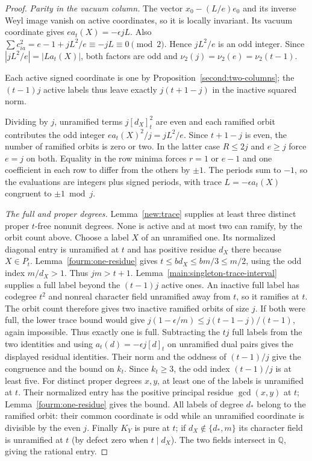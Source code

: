 \documentclass[11pt,a4paper]{article}
\numberwithin{equation}{section}
\theoremstyle{remark}
\begin{document}
\begin{proof}
\emph{Parity in the vacuum column.} The vector $x_0-(L/e)e_0$ and its inverse Weyl image vanish on active
coordinates, so it is locally invariant. Its vacuum coordinate gives
$ea_t(X)=-\epsilon jL$. Also
$\sum c_{ia}^2=e-1+jL^2/e\equiv -jL\equiv0\pmod2$.
Hence $jL^2/e$ is an odd integer. Since
$|jL^2/e|=|L a_t(X)|$, both factors are odd and
$\nu_2(j)=\nu_2(e)=\nu_2(t-1)$. 

Each active signed coordinate is one by Proposition~\ref{second:two-columns};
the $(t-1)j$ active labels thus leave exactly $j(t+1-j)$ in the
inactive squared norm.

Dividing by $j$, unramified
terms $j[d_X]_t^2$ are even and each ramified orbit contributes the
odd integer $ea_t(X)^2/j=jL^2/e$. Since $t+1-j$ is even, the number
of ramified orbits is zero or two. In the latter case $R\le2j$ and
$e\ge j$ force $e=j$ on both. Equality in the row minima forces
$r=1$ or $e-1$ and one coefficient in each row to differ from the
others by $\pm1$. The periods sum to $-1$, so the evaluations are
integers plus signed periods, with trace $L=-\epsilon a_t(X)$
congruent to $\pm1\bmod j$.

\emph{The full and proper degrees.} Lemma~\ref{new:trace} supplies at least three distinct
proper $t$-free nonunit degrees. None is active and at most two
can ramify, by the orbit count above. Choose a label $X$
of an unramified one. Its normalized diagonal entry is unramified
at $t$ and has positive residue $d_X$ there because $X\in P_t$.
Lemma~\ref{fourm:one-residue} gives
$t\le b d_X\le bm/3\le m/2$, using the odd index $m/d_X>1$.
Thus $jm>t+1$. Lemma~\ref{main:singleton-trace-interval} supplies a
full label beyond the $(t-1)j$ active ones.
An inactive full label has codegree $t^2$ and nonreal character field
unramified away from $t$, so it ramifies at $t$.
The orbit count therefore gives two inactive ramified orbits
of size $j$. If both were full, the lower trace bound would give
$j(1-\epsilon/m)\le j(t-1-j)/(t-1)$, again impossible.
Thus exactly one is full. Subtracting the $tj$ full labels from the two
identities and using $a_t(d)=-\epsilon j[d]_t$ on unramified dual
pairs gives the displayed residual identities. Their norm and the
oddness of $(t-1)/j$ give the congruence and the bound on $k_t$.
Since $k_t\ge3$, the odd index $(t-1)/j$ is at least five.
For distinct proper degrees $x,y$, at least one of the labels is
unramified at $t$. Their normalized entry has the positive principal
residue $\gcd(x,y)$ at $t$; Lemma~\ref{fourm:one-residue} gives the bound.
All labels of degree $d_*$ belong to the ramified orbit: their common
coordinate is odd while an unramified coordinate is divisible by the
even $j$. Finally $K_Y$ is pure at $t$; if $d_X\notin\{d_*,m\}$ its character
field is unramified at $t$ (by defect zero when $t\mid d_X$).
The two fields intersect in $\mathbb Q$, giving the rational entry.
\end{proof}
\end{document}
